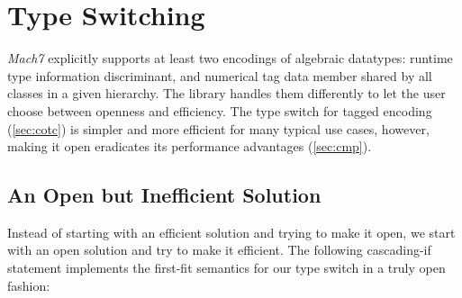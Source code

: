 \section{Type Switching}
\label{sec:copc}


\emph{Mach7} explicitly supports at least two encodings of algebraic
datatypes: runtime type information discriminant, and numerical tag
data member shared by all classes in a given hierarchy.  The library
handles them differently to let 
the user choose between openness and efficiency. The type switch for tagged 
encoding (\textsection\ref{sec:cotc}) is simpler and more efficient for many typical use cases, however, 
making it open eradicates its performance advantages (\textsection\ref{sec:cmp}). 


%

\subsection{An Open but Inefficient Solution}
\label{sec:poets}

Instead of starting with an efficient solution and trying to make it open, we 
start with an open solution and try to make it efficient. The following 
cascading-if statement implements the first-fit semantics for our type switch in 
a truly open fashion:


